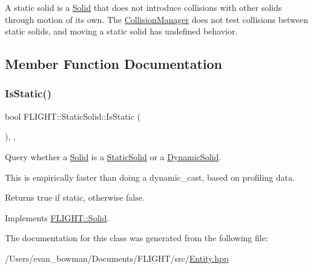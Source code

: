 A static solid is a \hyperlink{class_f_l_i_g_h_t_1_1_solid}{Solid} that does not introduce collisions with other solids through motion of its own. The \hyperlink{class_f_l_i_g_h_t_1_1_collision_manager}{Collision\+Manager} does not test collisions between static solids, and moving a static solid has undefined behavior. 

\subsection{Member Function Documentation}
\mbox{\label{class_f_l_i_g_h_t_1_1_static_solid_ae810b48d76acce73364e6b714a77f4cd}} 
\subsubsection{\texorpdfstring{Is\+Static()}{IsStatic()}}
{\footnotesize\ttfamily bool F\+L\+I\+G\+H\+T\+::\+Static\+Solid\+::\+Is\+Static (\begin{DoxyParamCaption}{ }\end{DoxyParamCaption})\hspace{0.3cm}{\ttfamily [inline]}, {\ttfamily [final]}, {\ttfamily [virtual]}}



Query whether a \hyperlink{class_f_l_i_g_h_t_1_1_solid}{Solid} is a \hyperlink{class_f_l_i_g_h_t_1_1_static_solid}{Static\+Solid} or a \hyperlink{class_f_l_i_g_h_t_1_1_dynamic_solid}{Dynamic\+Solid}. 

This is empirically faster than doing a dynamic\+\_\+cast, based on profiling data. \begin{DoxyReturn}{Returns}
true if static, otherwise false. 
\end{DoxyReturn}


Implements \hyperlink{class_f_l_i_g_h_t_1_1_solid_afcaa25bff89717d44a822723682a63f8}{F\+L\+I\+G\+H\+T\+::\+Solid}.



The documentation for this class was generated from the following file\+:\begin{DoxyCompactItemize}
\item 
/\+Users/evan\+\_\+bowman/\+Documents/\+F\+L\+I\+G\+H\+T/src/\hyperlink{_entity_8hpp}{Entity.\+hpp}\end{DoxyCompactItemize}
